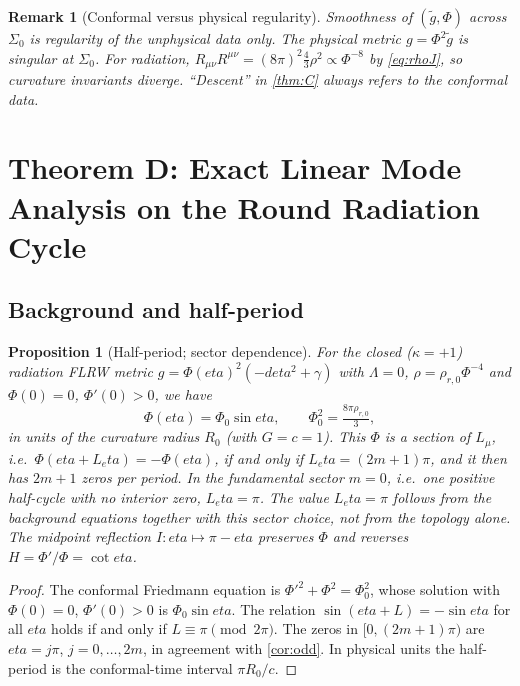 \documentclass[11pt]{article}
\theoremstyle{canonmath}
\newtheorem{remark}[theorem]{Remark}
\theoremstyle{canonpostulate}
\theoremstyle{canonproposition}
\theoremstyle{canonmath}
\newtheorem{proposition*}[theorem]{Proposition}
\theoremstyle{canonproposition}
\providecommand{\Lmu}{\mathcal{L}_\mu}
\def\mathcal#1{#1}%
\def\eta{eta}%
\begin{document}
\begin{remark}[Conformal versus physical regularity]\label{rem:physreg}
Smoothness of $(\tilde g,\Phi)$ across $\Sigma_0$ is regularity of the unphysical data only. The physical metric $g = \Phi^2\tilde g$ is singular at $\Sigma_0$. For radiation, $R_{\mu\nu}R^{\mu\nu} = (8\pi)^2\tfrac43\rho^2\propto\Phi^{-8}$ by \eqref{eq:rhoJ}, so curvature invariants diverge. ``Descent'' in \cref{thm:C} always refers to the conformal data.
\end{remark}

\section{Theorem D: Exact Linear Mode Analysis on the Round Radiation Cycle}
\label{sec:D}

\subsection{Background and half-period}

\begin{proposition*}[Half-period; sector dependence]\label{prop:period}
For the closed ($\kappa=+1$) radiation FLRW metric $g = \Phi(\eta)^2(-d\eta^2+\gamma)$ with $\Lambda = 0$, $\rho = \rho_{r,0}\Phi^{-4}$ and $\Phi(0) = 0$, $\Phi'(0)>0$, we have
\begin{equation}
\Phi(\eta) = \Phi_0\sin\eta, \qquad \Phi_0^2 = \tfrac{8\pi\rho_{r,0}}{3},
\label{eq:Phi_sin}
\end{equation}
in units of the curvature radius $R_0$ (with $G = c = 1$). This $\Phi$ is a section of $\Lmu$, i.e.\ $\Phi(\eta + L_\eta) = -\Phi(\eta)$, if and only if $L_\eta = (2m+1)\pi$, and it then has $2m+1$ zeros per period. In the fundamental sector $m = 0$, i.e.\ one positive half-cycle with no interior zero, $L_\eta = \pi$. The value $L_\eta=\pi$ follows from the background equations together with this sector choice, not from the topology alone. The midpoint reflection $I:\eta\mapsto\pi-\eta$ preserves $\Phi$ and reverses $\mathcal{H} = \Phi'/\Phi = \cot\eta$.
\end{proposition*}

\begin{proof}
The conformal Friedmann equation is $\Phi'^2 + \Phi^2 = \Phi_0^2$, whose solution with $\Phi(0) = 0$, $\Phi'(0)>0$ is $\Phi_0\sin\eta$. The relation $\sin(\eta+L) = -\sin\eta$ for all $\eta$ holds if and only if $L\equiv\pi\pmod{2\pi}$. The zeros in $[0,(2m+1)\pi)$ are $\eta = j\pi$, $j = 0,\dots,2m$, in agreement with \cref{cor:odd}. In physical units the half-period is the conformal-time interval $\pi R_0/c$.
\end{proof}
\end{document}
